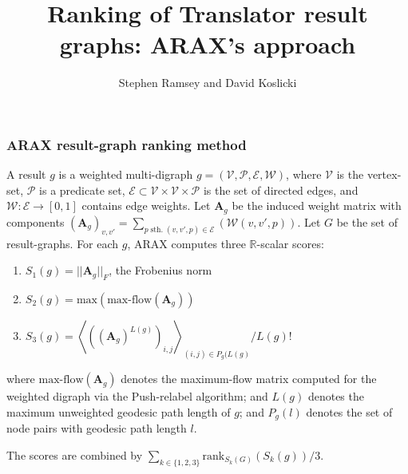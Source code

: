 \documentclass{beamer}
\title{Ranking of Translator result graphs: ARAX's approach}
\author{Stephen Ramsey and David Koslicki}
\institute{Team Expander Agent}
\begin{document}
\frame{\titlepage}
\begin{frame}
  \frametitle{ARAX result-graph ranking method} A result $g$ is a weighted
  multi-digraph $g = ({\mathcal V}, {\mathcal P}, {\mathcal E}, {\mathcal W})$,
  where ${\mathcal V}$ is the vertex-set, ${\mathcal P}$ is a predicate set,
  ${\mathcal E} \subset {\mathcal V} \times {\mathcal V} \times {\mathcal P}$ is
  the set of directed edges, and ${\mathcal W}: {\mathcal E} \rightarrow [0,1]$
  contains edge weights. Let $\boldsymbol{A}_g$ be the induced weight matrix
  with components $(\boldsymbol{A}_g)_{v,v'} = \sum_{p \; \textrm{sth.} \;
    (v,v',p) \in {\mathcal E}}({\mathcal W}(v,v',p))$.  Let $G$ be the set of result-graphs. For each
  $g$, ARAX computes three $\mathbb{R}$-scalar scores:
  \begin{enumerate}
  \item $S_1(g) = ||\boldsymbol{A}_g||_F$, the Frobenius norm
  \item $S_2(g) = \textrm{max}\left( \textrm{max-flow}(\boldsymbol{A}_g) \right)$
  \item $S_3(g) = \left\langle ((\boldsymbol{A}_g)^{L(g)})_{i,j}\right\rangle_{(i,j) \in P_g(L(g)}/L(g)!$
  \end{enumerate}
  where $\textrm{max-flow}(\boldsymbol{A}_g)$ denotes the maximum-flow matrix
  computed for the weighted digraph via the Push-relabel algorithm; and $L(g)$ denotes
  the maximum unweighted geodesic path length of $g$; and
  $P_g(l)$ denotes the set of node pairs with geodesic path length $l$.

  The scores are combined by $\sum_{k \in \{1,2,3\}}\textrm{rank}_{S_k(G)}(S_k(g))/3$.
\end{frame}
\end{document}

